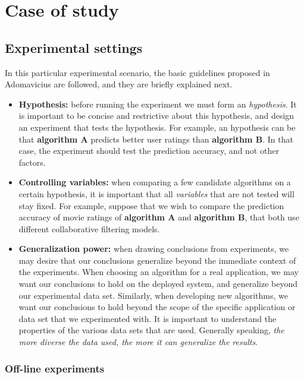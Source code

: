 \chapter{Case of study} \label{case}

\section{Experimental settings} 

In this particular experimental scenario, the basic guidelines 
proposed in Adomavicius \cite{adomavicius2011context} are followed,  
and they are briefly explained next. 
\begin{itemize} 
\item \textbf{Hypothesis:} before running the experiment we must form
an \textit{hypothesis}. It is important to be concise and restrictive
about this hypothesis, and design an experiment that tests the
hypothesis. For example, an hypothesis can be that  \textbf{algorithm
A} predicts better user ratings than  \textbf{algorithm B}.  In that
case, the experiment should test the prediction accuracy, and not
other factors.
\item \textbf{Controlling variables:} when comparing a few candidate
algorithms on a certain hypothesis, it is important that all
\textit{variables} that are not tested will stay fixed. For example,
suppose that we wish to compare the prediction accuracy of movie
ratings of  \textbf{algorithm A} and \textbf{algorithm B}, that both
use different collaborative filtering models.
\item \textbf{Generalization power:} when drawing conclusions from
experiments, we may desire that our conclusions generalize beyond the
immediate context of the experiments. When choosing an algorithm for a
real application, we may want our conclusions to hold on the deployed
system, and generalize beyond our experimental data set. Similarly,
when developing new algorithms, we want our conclusions to hold beyond
the scope of the specific application or data set that we experimented
with. It is important to understand the properties of the various data
sets that are used. Generally speaking, \textit{the more diverse the
data used, the more it can generalize the results}.
\end{itemize} 

\subsection{Off-line experiments} 

